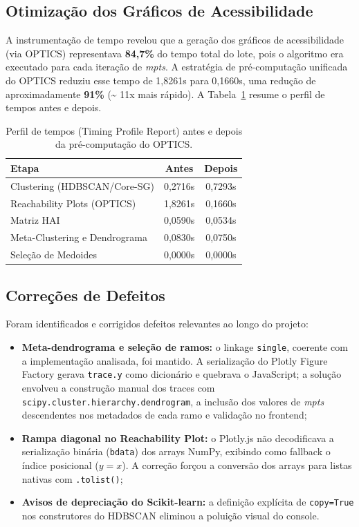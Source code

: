 \documentclass[12pt,a4paper,oneside]{article}
\begin{document}
\subsection{Otimização dos Gráficos de Acessibilidade}

A instrumentação de tempo revelou que a geração dos gráficos de acessibilidade (via OPTICS)
representava \textbf{84,7\%} do tempo total do lote, pois o algoritmo era executado para cada
iteração de \textit{mpts}. A estratégia de pré-computação unificada do OPTICS reduziu esse
tempo de 1,8261s para 0,1660s, uma redução de aproximadamente \textbf{91\%} (\textasciitilde
11x mais rápido). A Tabela~\ref{tab:optics} resume o perfil de tempos antes e depois.

\begin{table}[H]
  \centering
  \caption{Perfil de tempos (Timing Profile Report) antes e depois da pré-computação do
           OPTICS.}
  \label{tab:optics}
  \begin{tabular}{lcc}
    \toprule
    \textbf{Etapa} & \textbf{Antes} & \textbf{Depois} \\
    \midrule
    Clustering (HDBSCAN/Core-SG) & 0,2716s & 0,7293s \\
    Reachability Plots (OPTICS)  & 1,8261s & 0,1660s \\
    Matriz HAI                   & 0,0590s & 0,0534s \\
    Meta-Clustering e Dendrograma & 0,0830s & 0,0750s \\
    Seleção de Medoides          & 0,0000s & 0,0000s \\
    \bottomrule
  \end{tabular}
\end{table}

\subsection{Correções de Defeitos}

Foram identificados e corrigidos defeitos relevantes ao longo do projeto:

\begin{itemize}
  \item \textbf{Meta-dendrograma e seleção de ramos:} o linkage \texttt{single}, coerente com a
        implementação analisada, foi mantido. A serialização do Plotly Figure Factory gerava
        \texttt{trace.y} como dicionário e quebrava o JavaScript; a solução envolveu a
        construção manual dos traces com \texttt{scipy.cluster.hierarchy.dendrogram}, a inclusão
        dos valores de \textit{mpts} descendentes nos metadados de cada ramo e validação no
        frontend;
  \item \textbf{Rampa diagonal no Reachability Plot:} o Plotly.js não decodificava a
        serialização binária (\texttt{bdata}) dos arrays NumPy, exibindo como fallback o índice
        posicional ($y = x$). A correção forçou a conversão dos arrays para listas nativas com
        \texttt{.tolist()};
  \item \textbf{Avisos de depreciação do Scikit-learn:} a definição explícita de
        \texttt{copy=True} nos construtores do HDBSCAN eliminou a poluição visual do console.
\end{itemize}
\end{document}
